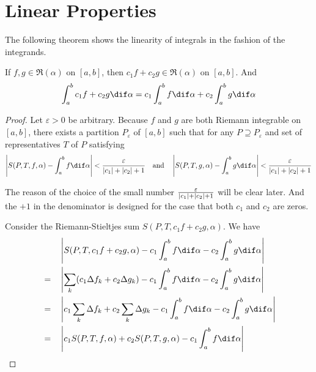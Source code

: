 \documentclass[thmcnt=section, color=blue, 12pt]{my-elegantbook}
\begin{document}
\section{Linear Properties}

The following theorem shows the linearity of integrals in the fashion of
the integrands.

\begin{theorem}
	If $f, g \in \mathfrak{R}(\alpha)$ on $[a, b]$,
	then $c_1 f + c_2 g \in \mathfrak{R}(\alpha)$ on $[a, b]$.
	And
	\begin{align}
		\int_a^b c_1 f + c_2 g \dif \alpha
		= c_1 \int_a^b f \dif \alpha + c_2 \int_a^b g \dif \alpha
		\label{eq:16}
	\end{align}
\end{theorem}

\begin{proof}
	Let $\varepsilon > 0$ be arbitrary.
	Because $f$ and $g$ are both Riemann integrable on $[a, b]$,
	there exists a partition $P_\varepsilon$ of $[a, b]$
	such that for any $P \supseteq P_\varepsilon$ and
	set of representatives $T$ of $P$ satisfying
	\begin{align}
		\abs{S(P,T,f,\alpha) - \int_a^b f \dif \alpha} < \frac{\varepsilon}{\abs{c_1} + \abs{c_2} + 1}
		\quad \text{and} \quad
		\abs{S(P,T,g,\alpha) - \int_a^b g \dif \alpha} < \frac{\varepsilon}{\abs{c_1} + \abs{c_2} + 1}
		\label{eq:15}
	\end{align}
	\begin{note}
		The reason of the choice of
		the small number $\frac{\varepsilon}{\left\lvert c_1 \right\rvert + \left\lvert c_2 \right\rvert + 1}$
		will be clear later.
		And the $+1$ in the denominator is designed for the case that
		both $c_1$ and $c_2$ are zeros.
	\end{note}
	Consider the Riemann-Stieltjes sum $S(P,T,c_1 f + c_2 g, \alpha)$.
	We have
	\begin{alignat*}{2}
		 & \quad &  & \abs{S(P,T,c_1 f + c_2 g, \alpha)
			- c_1 \int_a^b f \dif \alpha
		- c_2 \int_a^b g \dif \alpha}                   \\
		 & =     &  & \abs{
			\sum_k (c_1 \Delta f_k + c_2 \Delta g_k)
			- c_1 \int_a^b f \dif \alpha
		- c_2 \int_a^b g \dif \alpha}                   \\
		 & =     &  & \abs{
			c_1 \sum_k \Delta f_k + c_2  \sum_k \Delta g_k
			- c_1 \int_a^b f \dif \alpha
		- c_2 \int_a^b g \dif \alpha}                   \\
		 & =     &  & \abs{
			c_1 S(P,T,f,\alpha) + c_2 S(P,T,g,\alpha)
			- c_1 \int_a^b f \dif \alpha
}
\end{alignat*}
\end{proof}
\end{document}
